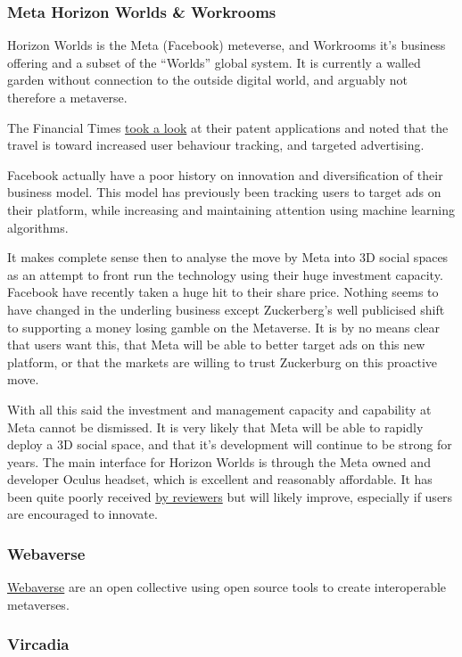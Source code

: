 \subsubsection{Meta Horizon Worlds \& Workrooms}
Horizon Worlds is the Meta (Facebook) meteverse, and Workrooms it's business offering and a subset of the ``Worlds'' global system. It is currently a walled garden without connection to the outside digital world, and arguably not therefore a metaverse.\par
The Financial Times \href{}{took a look} at their patent applications and noted that the travel is toward increased user behaviour tracking, and targeted advertising.\par
Facebook actually have a poor history on innovation and diversification of their business model. This model has previously been tracking users to target ads on their platform, while increasing and maintaining attention using machine learning algorithms. \par
It makes complete sense then to analyse the move by Meta into 3D social spaces as an attempt to front run the technology using their huge investment capacity. Facebook have recently taken a huge hit to their share price. Nothing seems to have changed in the underling business except Zuckerberg's well publicised shift to supporting a money losing gamble on the Metaverse. It is by no means clear that users want this, that Meta will be able to better target ads on this new platform, or that the markets are willing to trust Zuckerburg on this proactive move. \par
With all this said the investment and management capacity and capability at Meta cannot be dismissed. It is very likely that Meta will be able to rapidly deploy a 3D social space, and that it's development will continue to be strong for years. The main interface for Horizon Worlds is through the Meta owned and developer Oculus headset, which is excellent and reasonably affordable. It has been quite poorly received \href{https://kotaku.com/facebook-metaverse-horizon-worlds-vr-oculus-quest-2-cha-1848436740}{by reviewers} but will likely improve, especially if users are encouraged to innovate.
\subsubsection{Webaverse}
\href{https://webaverse.com/}{Webaverse} are an open collective using open source tools to create interoperable metaverses.
\subsubsection{Vircadia}

